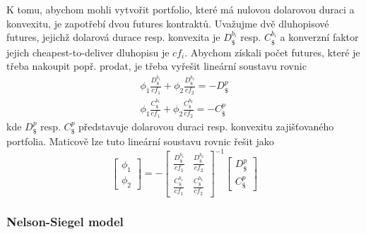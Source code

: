 \documentclass[a4paper]{book}
\begin{document}
K tomu, abychom mohli vytvořit portfolio, které má nulovou dolarovou duraci a konvexitu, je zapotřebí dvou futures kontraktů. Uvažujme dvě dluhopisové futures, jejichž dolarová durace resp. konvexita je $D_{\$}^{b_i}$ resp. $C_{\$}^{b_i}$ a konverzní faktor jejich cheapest-to-deliver dluhopisu je $cf_i$. Abychom získali počet futures, které je třeba nakoupit popř. prodat, je třeba vyřešit lineární soustavu rovnic
\begin{gather*}
\phi_1 \frac{D_{\$}^{b_1}}{cf_1} + \phi_2 \frac{D_{\$}^{b_2}}{cf_2} = -D_{\$}^p\\
\phi_1 \frac{C_{\$}^{b_1}}{cf_1} + \phi_2 \frac{C_{\$}^{b_2}}{cf_2} = -C_{\$}^p
\end{gather*}
kde $D_{\$}^p$ resp. $C_{\$}^p$ představuje dolarovou duraci resp. konvexitu zajišťovaného portfolia. Maticově lze tuto lineární soustavu rovnic řešit jako
\begin{equation*}
\begin{bmatrix}
\phi_1 \\
\phi_2
\end{bmatrix}
= -
\begin{bmatrix}
\frac{D_{\$}^{b_1}}{cf_1} & \frac{D_{\$}^{b_2}}{cf_2} \\
\frac{C_{\$}^{b_1}}{cf_1} & \frac{C_{\$}^{b_2}}{cf_2}
\end{bmatrix}^{-1}
\begin{bmatrix}
D_{\$}^p \\
C_{\$}^p
\end{bmatrix}
\end{equation*}

\subsubsection{Nelson-Siegel model}
\end{document}
